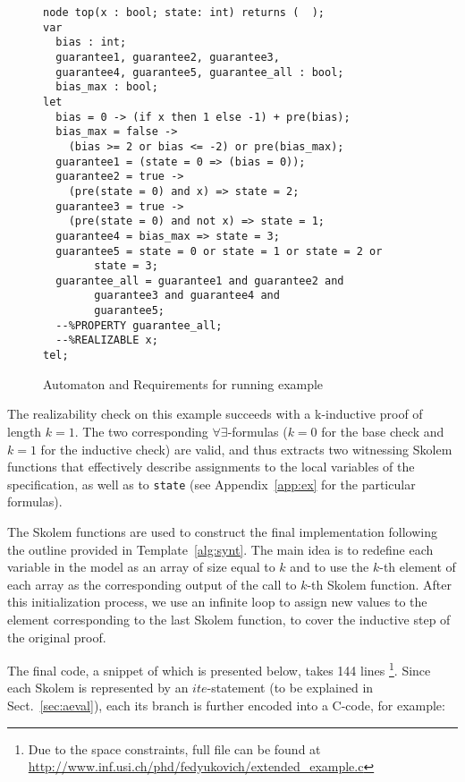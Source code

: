 \begin{figure}[tb]
\centering
{}
\begin{minipage}[c][4.5cm]{0.5\textwidth}
 \begin{Verbatim}[fontsize=\tiny]
node top(x : bool; state: int) returns (  );
var
  bias : int;
  guarantee1, guarantee2, guarantee3,
  guarantee4, guarantee5, guarantee_all : bool;
  bias_max : bool;
let
  bias = 0 -> (if x then 1 else -1) + pre(bias);
  bias_max = false ->
	(bias >= 2 or bias <= -2) or pre(bias_max);
  guarantee1 = (state = 0 => (bias = 0));
  guarantee2 = true ->
  	(pre(state = 0) and x) => state = 2;
  guarantee3 = true ->
  	(pre(state = 0) and not x) => state = 1;
  guarantee4 = bias_max => state = 3;
  guarantee5 = state = 0 or state = 1 or state = 2 or 
  		state = 3;
  guarantee_all = guarantee1 and guarantee2 and
  		guarantee3 and guarantee4 and 
  		guarantee5;
  --%PROPERTY guarantee_all;
  --%REALIZABLE x;
tel;
 \end{Verbatim}
\end{minipage}
\caption{Automaton and Requirements for running example}
\vspace{-1em}
\label{fg:example}
\end{figure}

The realizability check on this example succeeds with a k-inductive
proof of length $k = 1$. The two corresponding
$\forall\exists$-formulas ($k=0$ for the base check and $k=1$ for the
inductive check) are valid, and thus \aeval extracts two witnessing
Skolem functions that effectively describe assignments to the local
variables of the specification, as well as to \texttt{state} (see
Appendix~\ref{app:ex} for the particular formulas).

The Skolem functions are used to construct the final implementation
following the outline provided in Template~\ref{alg:synt}. 
The main idea is to redefine each variable in the model
as an array of size equal to $k$ and
to use the $k$-th element of each array as the corresponding output of the call
to $k$-th Skolem function. After this initialization process, we use an infinite
loop to assign new values to the element corresponding to the last Skolem
function, to cover the inductive step of the original proof.

The final code, a snippet of which is presented below, takes 144 lines%
\footnote{Due to the space constraints, full file can be found at \url{http://www.inf.usi.ch/phd/fedyukovich/extended_example.c}}.
Since each Skolem is represented by an $\mathit{ite}$-statement (to be explained in Sect.~\ref{sec:aeval}), each its branch is further encoded into a C-code, for example:

